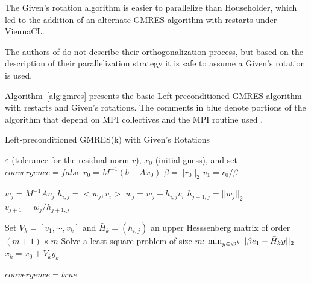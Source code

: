The Given's rotation algorithm is easier to parallelize than Householder, which led to the addition of an alternate GMRES algorithm with restarts under ViennaCL. 

The authors of \cite{Bahi2011} do not describe their orthogonalization process, but based on the description of their parallelization strategy it is safe to assume a Given's rotation is used.

Algorithm~\ref{alg:gmres} presents the basic Left-preconditioned GMRES algorithm with restarts and Given's rotations. The comments in blue denote portions of the algorithm that depend on MPI collectives and the MPI routine used . 


\begin{algorithm}                      %
\caption{Left-preconditioned GMRES(k) with Given's Rotations}          %
\label{alg:gmres}                           %
\begin{algorithmic}[1]                    %
    \State $\varepsilon$ (tolerance for the residual norm $r$), $x_0$ (initial guess), and set $convergence = false$
    \State $r_0 = M^{-1} (b-Ax_0)$
    \State $\beta = ||r_0||_2$			
    \State $v_1 = r_0 / \beta$ 

	 \label{alg:gmres_rotation_loop_start} 
			\State $w_j = M^{-1} A v_j$   
			\label{alg:gmres_inner_loop_start}
				\State $h_{i,j} = <w_j, v_i>$ 
				\State $w_j = w_j - h_{i,j} v_i$
			\EndFor \label{alg:gmres_inner_loop_stop}
			\State $h_{j+1, j}  = ||w_j||_2$		
			\State $v_{j+1} = w_j / h_{j+1,j}$		
	\EndFor\label{alg:gmres_rotation_loop_stop} 

			\State Set $V_k = [v_1, \cdots, v_k]$ and $\bar{H}_k = (h_{i,j})$ an upper Hesssenberg matrix of order $(m+1)\times m$
			\State \label{alg:gmres_least_squares} Solve a least-square problem of size $m$: $\min_{y \in \R^k} ||\beta e_1 - \bar{H}_k y||_2$	
			\State $x_k = x_0 + V_k y_k$ \label{alg:gmes_residual_norm}

		\State $convergence = true$
	\EndIf
    \EndWhile
\end{algorithmic}
\end{algorithm}



